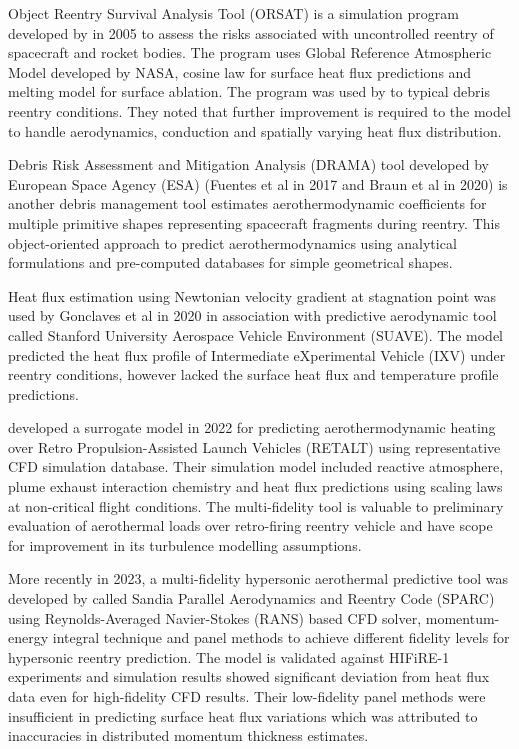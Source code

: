 \documentclass[%
 aip,
 amsmath,amssymb,
preprint,%
]{revtex4-1}
\begin{document}
Object Reentry Survival Analysis Tool (ORSAT) is a simulation program developed by \citet{Dobarco-Otero_Smith_Bledsoe_DeLaune_Rochelle_Johnson_2005} in 2005 to assess the risks associated with uncontrolled reentry of spacecraft and rocket bodies. The program uses Global Reference Atmospheric Model developed by NASA, cosine law for surface heat flux predictions and melting model for surface ablation. The program was used by \cite{Ostrom_Greene_Smith_Toledo-Burdett_Matney_Opiela_Marichalar_Bacon_Sanchez} to typical debris reentry conditions. They noted that further improvement is required to the model to handle aerodynamics, conduction and spatially varying heat flux distribution.



Debris Risk Assessment and Mitigation Analysis (DRAMA) tool developed by European Space Agency (ESA) (Fuentes et al in 2017 and Braun et al in 2020) is another debris management tool estimates aerothermodynamic coefficients for multiple primitive shapes representing spacecraft fragments during reentry. This object-oriented approach to predict aerothermodynamics using analytical formulations and pre-computed databases for simple geometrical shapes.

Heat flux estimation using Newtonian velocity gradient at stagnation point was used by Gonclaves et al in 2020 in association with predictive aerodynamic tool called Stanford University Aerospace Vehicle Environment (SUAVE). The model predicted the heat flux profile of Intermediate eXperimental Vehicle (IXV) under reentry conditions, however lacked the surface heat flux and temperature profile predictions.

\citet{Laureti_Karl_2022} developed a surrogate model in 2022 for predicting aerothermodynamic heating over Retro Propulsion-Assisted Launch Vehicles (RETALT) using representative CFD simulation database. Their simulation model included reactive atmosphere, plume exhaust interaction chemistry and heat flux predictions using scaling laws at non-critical flight conditions. The multi-fidelity tool is valuable to preliminary evaluation of aerothermal loads over retro-firing reentry vehicle and have scope for improvement in its turbulence modelling assumptions.

More recently in 2023, a multi-fidelity hypersonic aerothermal predictive tool was developed by \cite{Kirsch_Lance_Krueger_Freno_2023} called Sandia Parallel Aerodynamics and Reentry Code (SPARC) using Reynolds-Averaged Navier-Stokes (RANS) based CFD solver, momentum-energy integral technique and panel methods to achieve different fidelity levels for hypersonic reentry prediction. The model is validated against HIFiRE-1 experiments and simulation results showed significant deviation from heat flux data even for high-fidelity CFD results. Their low-fidelity panel methods were insufficient in predicting surface heat flux variations which was attributed to inaccuracies in distributed momentum thickness estimates.
\end{document}
